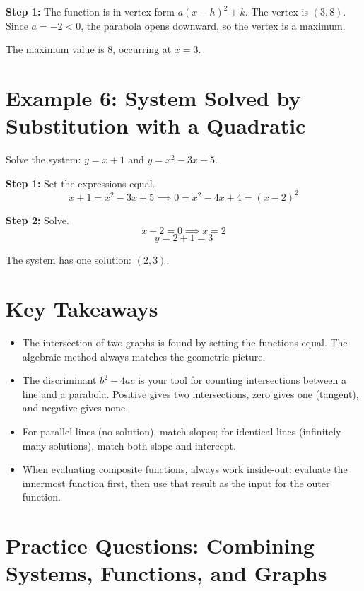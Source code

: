 \documentclass[14pt]{extarticle}
\begin{document}
\textbf{Step 1:} The function is in vertex form \(a(x - h)^2 + k\). The vertex is \((3, 8)\). Since \(a = -2 < 0\), the parabola opens downward, so the vertex is a maximum.

The maximum value is \(\boxed{8}\), occurring at \(x = \boxed{3}\).

\section*{Example 6: System Solved by Substitution with a Quadratic}

Solve the system: \(y = x + 1\) and \(y = x^2 - 3x + 5\).

\textbf{Step 1:} Set the expressions equal.
\[
x + 1 = x^2 - 3x + 5 \implies 0 = x^2 - 4x + 4 = (x - 2)^2
\]

\textbf{Step 2:} Solve.
\[
x - 2 = 0 \implies x = 2
\]
\[
y = 2 + 1 = 3
\]

The system has one solution: \(\boxed{(2, 3)}\).

\section*{Key Takeaways}
\begin{itemize}
  \item The intersection of two graphs is found by setting the functions equal. The algebraic method always matches the geometric picture.
  \item The discriminant \(b^2 - 4ac\) is your tool for counting intersections between a line and a parabola. Positive gives two intersections, zero gives one (tangent), and negative gives none.
  \item For parallel lines (no solution), match slopes; for identical lines (infinitely many solutions), match both slope and intercept.
  \item When evaluating composite functions, always work inside-out: evaluate the innermost function first, then use that result as the input for the outer function.
\end{itemize}

\newpage

\section*{Practice Questions: Combining Systems, Functions, and Graphs}
\end{document}
